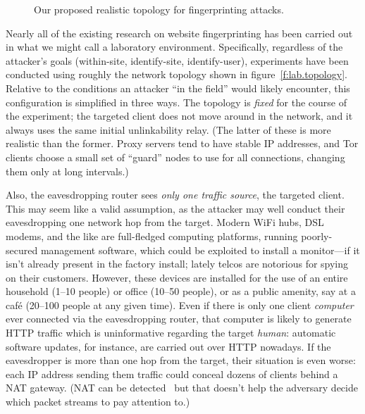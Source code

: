 \begin{figure*}[t!]
%
\caption{Our proposed realistic topology for fingerprinting attacks.}%
\label{f:real.topology}%
\end{figure*}


Nearly all of the existing research on website fingerprinting has been
carried out in what we might call a laboratory environment.
Specifically, regardless of the attacker's goals (within-site,
identify-site, identify-user), experiments have been conducted using
roughly the network topology shown in figure~\ref{f:lab.topology}.
Relative to the conditions an attacker “in the field” would likely
encounter, this configuration is simplified in three ways.  The
topology is \emph{fixed} for the course of the experiment; the
targeted client does not move around in the network, and it always
uses the same initial unlinkability relay.  (The latter of these is
more realistic than the former.  Proxy servers tend to have stable IP
addresses, and Tor clients choose a small set of “guard” nodes to use
for all connections, changing them only at long intervals.)

Also, the eavesdropping router sees \emph{only one traffic source},
the targeted client.  This may seem like a valid assumption, as the
attacker may well conduct their eavesdropping one network hop from the
target.  Modern WiFi hubs, DSL modems, and the like are full-fledged
computing platforms, running poorly-secured management software, which
could be exploited to install a monitor---if it isn't already present
in the factory install; lately telcos are notorious for spying on
their customers.  However, these devices are installed
for the use of an entire household (1--10 people) or office (10--50
people), or as a public amenity, say at a café (20--100 people at any
given time).  Even if there is only one client \emph{computer} ever
connected via the eavesdropping router, that computer is likely to
generate HTTP traffic which is uninformative regarding the target
\emph{human}: automatic software updates, for instance, are carried
out over HTTP nowadays.  If the eavesdropper is more than one hop from
the target, their situation is even worse: each IP address sending
them traffic could conceal dozens of clients behind a NAT gateway.
(NAT can be detected~\cite{elie2005timestamp,krmivcek2009netflow} but
that doesn't help the adversary decide which packet streams to pay
attention to.)

